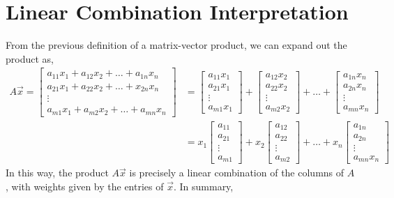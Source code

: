 \documentclass[letterpaper,12pt]{article}
\begin{document}
\section*{Linear Combination Interpretation}
From the previous definition of a matrix-vector product, we can expand out the product as,
\begin{align*}
    A\vec{x} = \begin{bmatrix} a_{11} x_1 + a_{12} x_2 + \dots + a_{1n} x_n \\ a_{21} x_1 + a_{22} x_2 + \dots + x_{2n} x_n \\ \vdots \\ a_{m1} x_1 + a_{m2} x_2 + \dots + a_{mn} x_n \end{bmatrix} & = \begin{bmatrix} a_{11} x_1 \\ a_{21} x_1 \\ \vdots \\ a_{m1} x_1 \end{bmatrix} + \begin{bmatrix} a_{12} x_2 \\ a_{22} x_2 \\ \vdots \\ a_{m2} x_2 \end{bmatrix} + \dots + \begin{bmatrix} a_{1n} x_n \\ a_{2n} x_n \\ \vdots \\ a_{mn} x_n \end{bmatrix} \\
    & = x_1 \begin{bmatrix} a_{11} \\ a_{21} \\ \vdots \\ a_{m1} \end{bmatrix} + x_2 \begin{bmatrix} a_{12} \\ a_{22} \\ \vdots \\ a_{m2} \end{bmatrix} + \dots + x_n \begin{bmatrix} a_{1n} \\ a_{2n} \\ \vdots \\ a_{mn} x_n \end{bmatrix}
\end{align*}
In this way, the product $A\vec{x}$ is precisely a linear combination of the columns of $A$, with weights given by the entries of $\vec{x}$. In summary,
\end{document}
